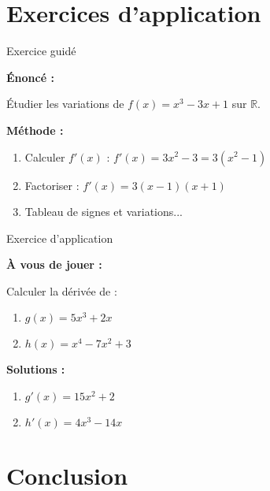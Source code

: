 \documentclass[12pt, xcolor={svgnames}]{beamer}
\theoremstyle{definition}
\begin{document}
\section{Exercices d'application}

\begin{frame}{Exercice guidé}
  \begin{exobeamer}
    \textbf{Énoncé :}

    Étudier les variations de $f(x) = x^3 - 3x + 1$ sur $\mathbb{R}$.

    \pause

    \textbf{Méthode :}
    \begin{enumerate}
      \item<3-> Calculer $f'(x)$ : $f'(x) = 3x^2 - 3 = 3(x^2 - 1)$
      \item<4-> Factoriser : $f'(x) = 3(x-1)(x+1)$
      \item<5-> Tableau de signes et variations...
    \end{enumerate}
  \end{exobeamer}
\end{frame}

\begin{frame}{Exercice d'application}
  \begin{exobeamer}
    \textbf{À vous de jouer :}

    Calculer la dérivée de :
    \begin{enumerate}
      \item $g(x) = 5x^3 + 2x$
      \item $h(x) = x^4 - 7x^2 + 3$
    \end{enumerate}

    \pause
    \vspace{0.5em}

    \textbf{Solutions :}
    \begin{enumerate}
      \item<3-> $g'(x) = 15x^2 + 2$
      \item<4-> $h'(x) = 4x^3 - 14x$
    \end{enumerate}
  \end{exobeamer}
\end{frame}

\section{Conclusion}
\end{document}

